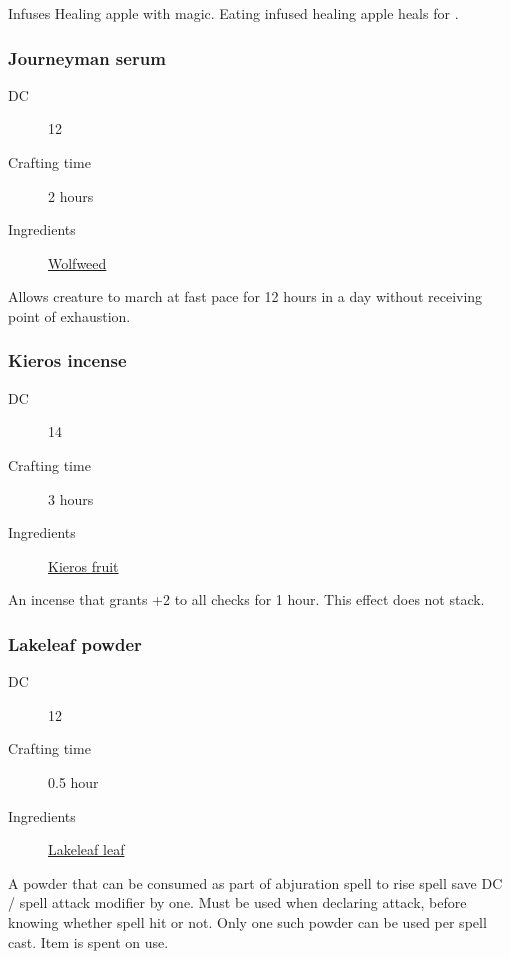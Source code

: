 Infuses Healing apple with magic. Eating infused healing apple heals for .

\subsubsection{Journeyman serum}

\begin{description}
\item [DC] 12 \survival
\item [Crafting time] 2 hours
\item [Ingredients] \hyperref[Wolfweed]{Wolfweed}
\end{description}

Allows creature to march at fast pace for 12 hours in a day without receiving point of exhaustion.

\subsubsection{Kieros incense}
\label{Kieros incense}

\begin{description}
\item [DC] 14 \nature
\item [Crafting time] 3 hours
\item [Ingredients] \hyperref[Kieros]{Kieros fruit}
\end{description}

An incense that grants +2 to all \intimidation checks for 1 hour. This effect does not stack.

\subsubsection{Lakeleaf powder}
\label{Lakeleaf powder}

\begin{description}
\item [DC] 12 \arcana
\item [Crafting time] 0.5 hour
\item [Ingredients] \hyperref[Lakeleaf]{Lakeleaf leaf}
\end{description}

A powder that can be consumed as part of abjuration spell to rise spell save DC / spell attack modifier by one. Must be used when declaring attack, before knowing whether spell hit or not. Only one such powder can be used per spell cast. Item is spent on use.

